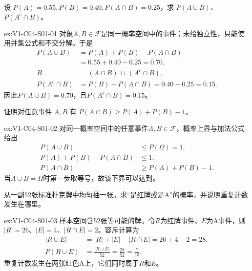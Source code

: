 \begin{SLChapterExercisePairSection}

\begin{exercise}\label{ex:V1-C04-S01-01}
设 $P(A)=0.55,P(B)=0.40,P(A\cap B)=0.25$，求 $P(A\cup B)$、$P(A^{\mathrm c}\cap B)$。
\end{exercise}
\label{sol:V1-C04-S01-01}
\begin{chapterexercisesolution}{ex:V1-C04-S01-01}
对象$A,B\in\mathcal F$是同一概率空间中的事件；未给独立性，只能使用并集公式和不交分解。于是
\[
\begin{aligned}
P(A\cup B)&=P(A)+P(B)-P(A\cap B)\\
&=0.55+0.40-0.25=0.70,\\
B&=(A\cap B)\,\dot\cup\,(A^{\mathrm c}\cap B),\\
P(A^{\mathrm c}\cap B)&=P(B)-P(A\cap B)
=0.40-0.25=0.15.
\end{aligned}
\]
因此$P(A\cup B)=0.70$，且$P(A^{\mathrm c}\cap B)=0.15$。
\end{chapterexercisesolution}

\begin{exercise}\label{ex:V1-C04-S01-02}
证明对任意事件 $A,B$ 有 $P(A\cap B)\ge P(A)+P(B)-1$。
\end{exercise}
\label{sol:V1-C04-S01-02}
\begin{chapterexercisesolution}{ex:V1-C04-S01-02}
对同一概率空间中的任意事件$A,B\in\mathcal F$，概率上界与加法公式给出
\[
\begin{aligned}
P(A\cup B)&\le P(\Omega)=1,\\
P(A)+P(B)-P(A\cap B)&\le1,\\
P(A\cap B)&\ge P(A)+P(B)-1.
\end{aligned}
\]
当$A\cup B=\Omega$时第一步取等号，故该下界可以达到。
\end{chapterexercisesolution}

\begin{exercise}\label{ex:V1-C04-S01-03}
从一副52张标准扑克牌中均匀抽一张。求“是红牌或是A”的概率，并说明重复计数发生在哪里。
\end{exercise}
\label{sol:V1-C04-S01-03}
\begin{chapterexercisesolution}{ex:V1-C04-S01-03}
样本空间含52张等可能的牌。令$R$为红牌事件、$E$为A事件，则$|R|=26$、$|E|=4$、$|R\cap E|=2$。容斥计算为
\[
\begin{aligned}
|R\cup E|&=|R|+|E|-|R\cap E|=26+4-2=28,\\
P(R\cup E)&=\frac{|R\cup E|}{52}
=\frac{28}{52}=\frac7{13}.
\end{aligned}
\]
重复计数发生在两张红色A上，它们同时属于$R$和$E$。
\end{chapterexercisesolution}


\end{SLChapterExercisePairSection}
